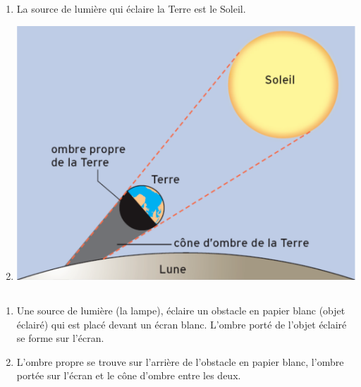 \documentclass[12pt,a4paper]{article}
\begin{document}
\subsection*{}
	\begin{enumerate}
		\item La source de lumière qui éclaire la Terre est le Soleil.
		\item \begin{center}
			\includegraphics[scale=0.4]{exo11}
		\end{center}
	\end{enumerate}

\subsection*{}
	\begin{enumerate}
		\item Une source de lumière (la lampe), éclaire un obstacle en papier blanc (objet éclairé) qui est placé devant un écran blanc. L'ombre porté de l'objet éclairé se forme sur l'écran.
		\item L'ombre propre se trouve sur l'arrière de l'obstacle en papier blanc, l'ombre portée sur l'écran et le cône d'ombre entre les deux.
	\end{enumerate}
\end{document}
